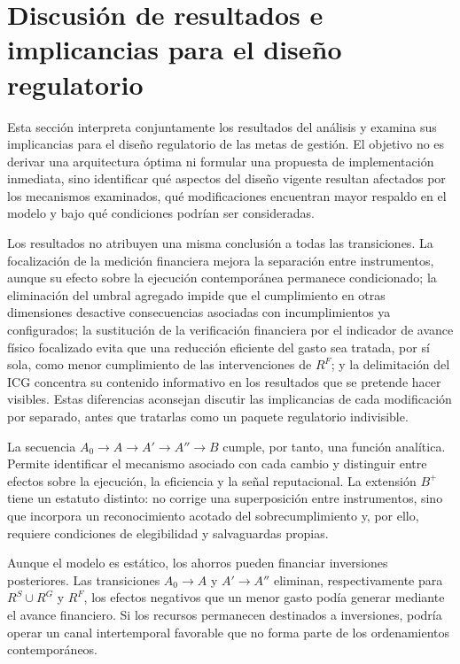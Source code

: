 \section{Discusión de resultados e implicancias para el diseño regulatorio}
\label{sec:implicancias_regulatorias}

Esta sección interpreta conjuntamente los resultados del análisis y examina sus implicancias para el diseño regulatorio de las metas de gestión. El objetivo no es derivar una arquitectura óptima ni formular una propuesta de implementación inmediata, sino identificar qué aspectos del diseño vigente resultan afectados por los mecanismos examinados, qué modificaciones encuentran mayor respaldo en el modelo y bajo qué condiciones podrían ser consideradas.

Los resultados no atribuyen una misma conclusión a todas las transiciones. La focalización de la medición financiera mejora la separación entre instrumentos, aunque su efecto sobre la ejecución contemporánea permanece condicionado; la eliminación del umbral agregado impide que el cumplimiento en otras dimensiones desactive consecuencias asociadas con incumplimientos ya configurados; la sustitución de la verificación financiera por el indicador de avance físico focalizado evita que una reducción eficiente del gasto sea tratada, por sí sola, como menor cumplimiento de las intervenciones de \(R^{F}\); y la delimitación del ICG concentra su contenido informativo en los resultados que se pretende hacer visibles. Estas diferencias aconsejan discutir las implicancias de cada modificación por separado, antes que tratarlas como un paquete regulatorio indivisible.

La secuencia \(A_{0}\rightarrow A\rightarrow A'\rightarrow A''\rightarrow B\) cumple, por tanto, una función analítica. Permite identificar el mecanismo asociado con cada cambio y distinguir entre efectos sobre la ejecución, la eficiencia y la señal reputacional. La extensión \(B^{+}\) tiene un estatuto distinto: no corrige una superposición entre instrumentos, sino que incorpora un reconocimiento acotado del sobrecumplimiento y, por ello, requiere condiciones de elegibilidad y salvaguardas propias.


Aunque el modelo es estático, los ahorros pueden financiar inversiones posteriores. Las transiciones \(A_0\to A\) y \(A'\to A''\) eliminan, respectivamente para \(R^{S}\cup R^{G}\) y \(R^{F}\), los efectos negativos que un menor gasto podía generar mediante el avance financiero. Si los recursos permanecen destinados a inversiones, podría operar un canal intertemporal favorable que no forma parte de los ordenamientos contemporáneos.


